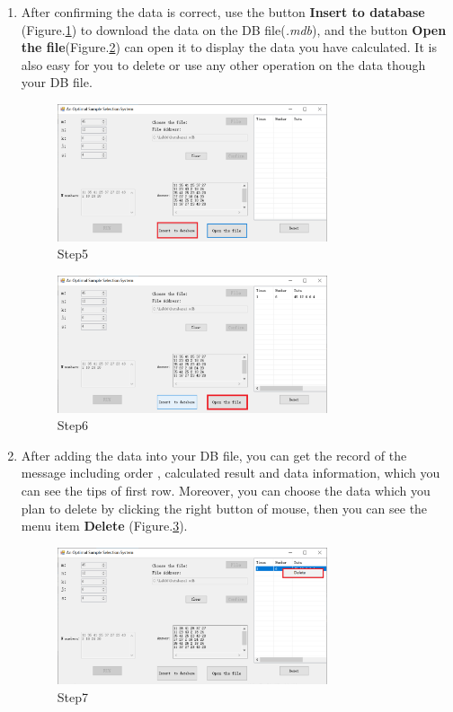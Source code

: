 \begin{enumerate}
\item After confirming the data is correct, use the button \textbf{Insert to database}
(Figure.\ref{fig:st5}) to download the data on the DB file(\emph{\*.mdb}), and the button \textbf{Open the file}(Figure.\ref{fig:st6}) can open it to display the data you have calculated. 
It is also easy for you to delete or use any other operation on the data though your DB file.
\begin{figure}[!htbp]
	\centering
	\includegraphics[width=0.75\textwidth]{images/step5.png}
	\caption{Step5}
	\label{fig:st5}
\end{figure}
\begin{figure}[!htbp]
	\centering
	\includegraphics[width=0.75\textwidth]{images/step6.png}
	\caption{Step6}
	\label{fig:st6}
\end{figure}

\item After adding the data into your DB file, you can get the record of the message 
including order , calculated result and data information, which you can see the tips of first row.
Moreover, you can choose the data which you plan to delete by clicking the right button of mouse, 
then you can see the menu item \textbf{Delete} (Figure.\ref{fig:st7}). 
\begin{figure}[!htbp]
	\centering
	\includegraphics[width=0.75\textwidth]{images/step7.png}
	\caption{Step7}
	\label{fig:st7}
\end{figure}


\end{enumerate}
